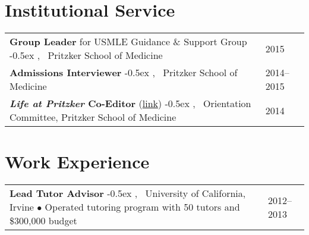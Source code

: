 \documentclass[letterpaper]{article}
\newcommand{\newlineb}                 %
    {
      \newline 
      \small                           %
      \hspace{0.30cm}                  %
      $\bullet$                        %
      }
\newcommand{\newlinea}{\kern-0.5ex , \ } %
\begin{document}

\section*{Institutional Service \hrulefill}
\begin{tabular}{L{14.5 cm}R{2.0 cm}}

\textbf{Group Leader} for USMLE Guidance \& Support Group
  \newlinea Pritzker School of Medicine
& 2015 \\
  
\textbf{Admissions Interviewer}
  \newlinea Pritzker School of Medicine
& 2014--2015 \\
  
\textbf{\textit{Life at Pritzker} Co-Editor} (\href{https://dl.dropboxusercontent.com/u/73608618/shared/LifeatPritzker2014.pdf}{link})
  \newlinea Orientation Committee, Pritzker School of Medicine
& 2014 \\

\end{tabular}


\section*{Work Experience \hrulefill}
\begin{tabular}{L{14.5 cm}R{2.0 cm}}

\textbf{Lead Tutor Advisor}
  \newlinea University of California, Irvine
  {\newlineb Operated tutoring program with 50 tutors and \$300,000 budget}
& 2012--2013 \\

 

\end{tabular}
\end{document}

